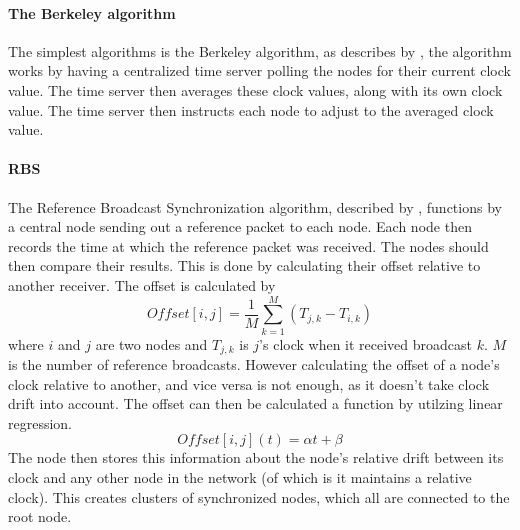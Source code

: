 \documentclass[a4paper,12pt]{article}
\begin{document}
    \paragraph{The Berkeley algorithm} The simplest algorithms is the Berkeley algorithm, as describes by \citet{Gusella89}, the algorithm works by having a centralized time server polling the nodes for their current clock value. The time server then averages these clock values, along with its own clock value. The time server then instructs each node to adjust to the averaged clock value. 

    \paragraph{RBS} The Reference Broadcast Synchronization algorithm, described by \citet{ElsonGirodEstrin02},  functions by a central node sending out a reference packet to each node. Each node then records the time at which the reference packet was received. %
    The nodes should then compare their results. This is done by calculating their offset relative to another receiver. The offset is calculated by 
    \begin{equation}
        \label{offsetcalc}
        \textit{Offset} [i,j] = \frac{1}{M}\sum^M_{k=1} (T_{j,k} - T_{i,k})
    \end{equation}
    where $i$ and $j$ are two nodes and $T_{j,k}$ is $j$'s clock when it received broadcast $k$. $M$ is the number of reference broadcasts.  %
    However calculating the offset of a node's clock relative to another, and vice versa is not enough, as it doesn't take clock drift into account. The offset can then be calculated a function by utilzing linear regression. 
    $$\textit{Offset}[i,j](t) = \alpha t + \beta$$
    The node then stores this information about the node's relative drift between its clock and any other node in the network (of which is it maintains a relative clock). This creates clusters of synchronized nodes, which all are connected to the root node.
    
\end{document}
